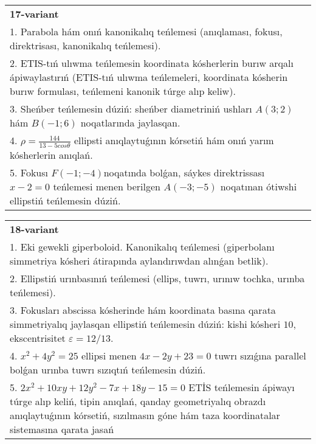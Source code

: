 \documentclass{article}
\begin{document}
\begin{tabular}{m{17cm}}
\textbf{17-variant}\\
1. Parabola hám onıń kanonikalıq teńlemesi (anıqlaması, fokusı, direktrisası, kanonikalıq teńlemesi).\\

2. ETIS-tıń ulıwma teńlemesin koordinata kósherlerin burıw arqalı ápiwaylastırıń (ETIS-tıń ulıwma teńlemeleri, koordinata kósherin burıw formulası, teńlemeni kanonik túrge alıp keliw).\\

3. Sheńber teńlemesin dúziń: sheńber diametriniń ushları $A (3;2) $ hám $B (-1;6 ) $ noqatlarında jaylasqan.\\

4. $\rho = \frac{144}{13 - 5cos\theta}$ ellipsti anıqlaytuǵının kórsetiń hám onıń yarım kósherlerin anıqlań.\\

5. Fokusı $F( - 1; - 4)$noqatında bolǵan, sáykes direktrissası $x - 2 = 0$ teńlemesi menen berilgen $A( - 3; - 5)$ noqatınan ótiwshi ellipstiń teńlemesin dúziń.  
\end{tabular}
\vspace{1cm}


\begin{tabular}{m{17cm}}
\textbf{18-variant}\\
1. Eki gewekli giperboloid. Kanonikalıq teńlemesi (giperbolanı simmetriya kósheri átirapında aylandırıwdan alınǵan betlik).\\

2. Ellipstiń urınbasınıń teńlemesi (ellips, tuwrı, urınıw tochka, urınba teńlemesi).\\

3. Fokusları abscissa kósherinde hám koordinata basına qarata simmetriyalıq jaylasqan ellipstiń teńlemesin dúziń: kishi kósheri $10$, ekscentrisitet $\varepsilon=12/13$.\\

4. $x^{2} + 4y^{2} = 25$ ellipsi menen $4x - 2y + 23 = 0$ tuwrı sızıǵına parallel bolǵan urınba tuwrı sızıqtıń teńlemesin dúziń.  \\

5. $2x^{2} + 10xy + 12y^{2} - 7x + 18y - 15 = 0$ ETİS teńlemesin ápiwayı túrge alıp keliń, tipin anıqlań, qanday geometriyalıq obrazdı anıqlaytuǵının kórsetiń, sızılmasın góne hám taza koordinatalar sistemasına qarata jasań  
\end{tabular}
\vspace{1cm}
\end{document}
